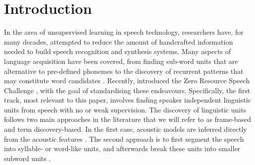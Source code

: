 \section{Introduction}
\label{sec:introduction}
In the area of unsupervised learning in speech technology, researchers have, for many decades, attempted to reduce the amount of handcrafted information needed to build speech recognition and synthesis systems.
Many aspects of language acquisition have been covered, from finding sub-word units that are alternative to pre-defined phonemes \parencite{LeeEtAl1988,SvendsenEtAl1989,BacchianiEtAl1996,huijbregts2011unsupervised, OGrady:2008up} to the discovery of recurrent patterns that may constitute word candidates \cite{Rasanen2011149, park2008unsupervised, Aimetti2010, StoutenEtAl2008phonepatterns, DriesenEtAl2009adaptivenon-negative, gs:VanhainenAndSalvi2012Interspeech, gs:VanhainenAndSalvi2014ICASSP}.
Recently, \citeauthor{versteegh2015zero} introduced the Zero Resource Speech Challenge \parencite{versteegh2015zero}, with the goal of standardising these endeavours.
Specifically, the first track, most relevant to this paper, involves finding speaker independent linguistic units from speech with no or weak supervision.
The discovery of linguistic units follows two main approaches in the literature that we will refer to as frame-based and term discovery-based. 
In the first case, acoustic models are inferred directly from the acoustic features \parencite{varadarajan2008unsupervised, lee2012nonparametric, siu2014unsupervised, chen2015parallel, zhang2010towards, versteegh2016zero, heck2016unsupervised, synnaeve2016temporal}.
The second approach is to first segment the speech into syllable- or word-like units, and afterwards break these units into smaller subword units \parencite{jansen2013weak, park2008unsupervised, jansen2011efficient, versteegh2015zero, jansen2011towards, jansen2013weak, synnaeve2014phonetics, thiolliere2015hybrid, versteegh2016zero, zeghidour2016deep, kamper2015unsupervised, renshaw2015comparison}.

